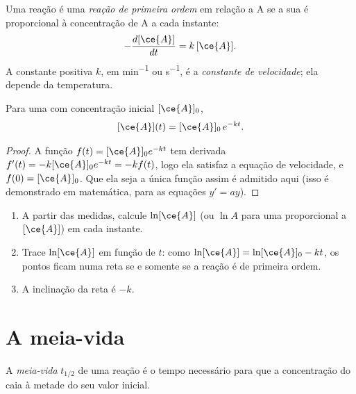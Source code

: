 \begin{definition}\label{def:g12:reaction-rates:first-order}
Uma reação é uma \emph{reação de primeira ordem}
em relação a A se a sua  é proporcional à
concentração de A a cada instante:
\[
  -\frac{d[\ce{A}]}{dt} = k\,[\ce{A}] .
\]
A constante positiva $k$, em \si{min^{-1}} ou \si{s^{-1}}, é a
\emph{constante de velocidade}; ela
depende da temperatura.
\end{definition}

\begin{proposition}\label{prop:g12:reaction-rates:exponential}
Para uma  com concentração inicial
$[\ce{A}]_0$,
\[
  [\ce{A}](t) = [\ce{A}]_0\, e^{-kt} .
\]
\end{proposition}

\begin{proof}
A função $f(t) = [\ce{A}]_0 e^{-kt}$ tem derivada
$f'(t) = -k [\ce{A}]_0 e^{-kt} = -k f(t)$, logo ela satisfaz a equação
de velocidade, e $f(0) = [\ce{A}]_0$. Que ela seja a única função assim
é admitido aqui (isso é demonstrado em matemática, para as equações
$y' = ay$).
\end{proof}

\begin{method}\label{met:g12:reaction-rates:test}
\begin{enumerate}
  \item A partir das medidas, calcule $\ln [\ce{A}]$ (ou $\ln A$ para
        uma  proporcional a $[\ce{A}]$) em cada instante.
  \item Trace $\ln[\ce{A}]$ em função de $t$: como
        $\ln[\ce{A}] = \ln[\ce{A}]_0 - kt$, os pontos ficam numa reta se
        e somente se a reação é de primeira ordem.
  \item A inclinação da reta é $-k$.
\end{enumerate}
\end{method}

\section{A meia-vida}

\begin{definition}\label{def:g12:reaction-rates:half-life}
A \emph{meia-vida} $t_{1/2}$ de uma reação é o tempo
necessário para que a concentração do  caia à metade
do seu valor inicial.
\end{definition}

